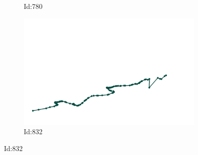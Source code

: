 \documentclass[12pt,twoside]{report}
\begin{document}
\begin{figure}
\begin{subfigure}[b]{0.20\textwidth}
\caption{Id:780}
\end{subfigure}
\begin{subfigure}[b]{0.20\textwidth}
\centering
\includegraphics[width=\textwidth]{../../trajectories/832.png}
\caption{Id:832}
\end{subfigure}
\end{figure}
\end{document}
